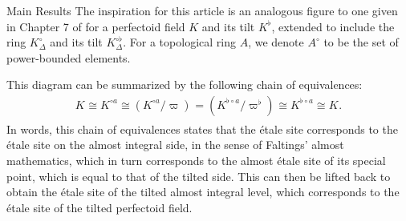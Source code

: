 \documentclass[12pts,a4paper]{amsart}
\DeclareMathOperator{\spec}{Spec}
\DeclareMathOperator{\fet}{f\acute{e}t}
\begin{document}
\begin{subsection}{Main Results}
  The inspiration for this article is an analogous figure to one given in Chapter 7 of \cite{Sch2} for a perfectoid field $K$ and its tilt $K^\flat$, extended to include the ring $K^\circ_\Delta$ and its tilt $K^{\circ\flat}_\Delta$. For a topological ring $A$, we denote $A^\circ$ to be the set of power-bounded elements.

\begin{center}
\end{center}

This diagram can be summarized by the following chain of equivalences:
\begin{align*}
    K_{\fet}\cong K^{\circ a}_{\fet}\cong (K^{\circ a}/\varpi)_{\fet}=(K^{\flat\circ a}/\varpi^\flat)_{\fet}\cong K^{\flat\circ a}_{\fet}\cong K_{\fet}.
\end{align*}
In words, this chain of equivalences states that the \'etale site corresponds to the \'etale site on the almost integral side, in the sense of Faltings' almost mathematics, which in turn corresponds to the almost \'etale site of its special point, which is equal to that of the tilted side. This can then be lifted back to obtain the \'etale site of the tilted almost integral level, which corresponds to the \'etale site of the tilted perfectoid field.


\end{subsection}
\end{document}
